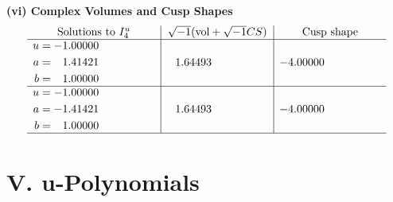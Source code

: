 \documentclass[1p]{elsarticle_modified}
\theoremstyle{definition}
\newcommand{\I}{\sqrt{-1}}
\begin{document}
\newpage\flushleft \textbf{(vi) Complex Volumes and Cusp Shapes}
$$\begin{array}{c|c|c}  
\text{Solutions to }I^u_{4}& \I (\text{vol} + \sqrt{-1}CS) & \text{Cusp shape}\\
 \hline 
\begin{aligned}
u &= -1.00000\phantom{ +0.000000I} \\
a &= \phantom{-}1.41421\phantom{ +0.000000I} \\
b &= \phantom{-}1.00000\phantom{ +0.000000I}\end{aligned}
 & \phantom{-}1.64493\phantom{ +0.000000I} & -4.00000\phantom{ +0.000000I} \\ \hline\begin{aligned}
u &= -1.00000\phantom{ +0.000000I} \\
a &= -1.41421\phantom{ +0.000000I} \\
b &= \phantom{-}1.00000\phantom{ +0.000000I}\end{aligned}
 & \phantom{-}1.64493\phantom{ +0.000000I} & -4.00000\phantom{ +0.000000I}\\
 \hline 
 \end{array}$$\newpage
\newpage\renewcommand{\arraystretch}{1}
\centering \section*{ V. u-Polynomials}
\end{document}
